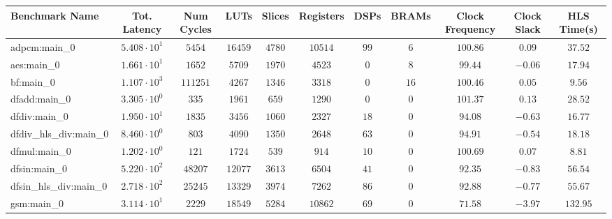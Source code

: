 \begin{tabular}{|l|c|c|c|c|c|c|c|c|c|c|}
\hline
Benchmark Name          & Tot. Latency           & Num Cycles & LUTs       & Slices    & Registers & DSPs    & BRAMs  & Clock Frequency & Clock Slack & HLS Time(s) \\
\hline
adpcm:main\_0           & $ 5.408 \cdot 10^{1} $ & $ 5454   $ & $ 16459  $ & $ 4780  $ & $ 10514 $ & $ 99  $ & $ 6  $ & $ 100.86      $ & $ 0.09    $ & $ 37.52   $ \\
aes:main\_0             & $ 1.661 \cdot 10^{1} $ & $ 1652   $ & $ 5709   $ & $ 1970  $ & $ 4523  $ & $ 0   $ & $ 8  $ & $ 99.44       $ & $ -0.06   $ & $ 17.94   $ \\
bf:main\_0              & $ 1.107 \cdot 10^{3} $ & $ 111251 $ & $ 4267   $ & $ 1346  $ & $ 3318  $ & $ 0   $ & $ 16 $ & $ 100.46      $ & $ 0.05    $ & $ 9.56    $ \\
dfadd:main\_0           & $ 3.305 \cdot 10^{0} $ & $ 335    $ & $ 1961   $ & $ 659   $ & $ 1290  $ & $ 0   $ & $ 0  $ & $ 101.37      $ & $ 0.13    $ & $ 28.52   $ \\
dfdiv:main\_0           & $ 1.950 \cdot 10^{1} $ & $ 1835   $ & $ 3456   $ & $ 1060  $ & $ 2327  $ & $ 18  $ & $ 0  $ & $ 94.08       $ & $ -0.63   $ & $ 16.77   $ \\
dfdiv\_hls\_div:main\_0 & $ 8.460 \cdot 10^{0} $ & $ 803    $ & $ 4090   $ & $ 1350  $ & $ 2648  $ & $ 63  $ & $ 0  $ & $ 94.91       $ & $ -0.54   $ & $ 18.18   $ \\
dfmul:main\_0           & $ 1.202 \cdot 10^{0} $ & $ 121    $ & $ 1724   $ & $ 539   $ & $ 914   $ & $ 10  $ & $ 0  $ & $ 100.69      $ & $ 0.07    $ & $ 8.81    $ \\
dfsin:main\_0           & $ 5.220 \cdot 10^{2} $ & $ 48207  $ & $ 12077  $ & $ 3613  $ & $ 6504  $ & $ 41  $ & $ 0  $ & $ 92.35       $ & $ -0.83   $ & $ 56.54   $ \\
dfsin\_hls\_div:main\_0 & $ 2.718 \cdot 10^{2} $ & $ 25245  $ & $ 13329  $ & $ 3974  $ & $ 7262  $ & $ 86  $ & $ 0  $ & $ 92.88       $ & $ -0.77   $ & $ 55.67   $ \\
gsm:main\_0             & $ 3.114 \cdot 10^{1} $ & $ 2229   $ & $ 18549  $ & $ 5284  $ & $ 10862 $ & $ 69  $ & $ 0  $ & $ 71.58       $ & $ -3.97   $ & $ 132.95  $ \\

\end{tabular}
